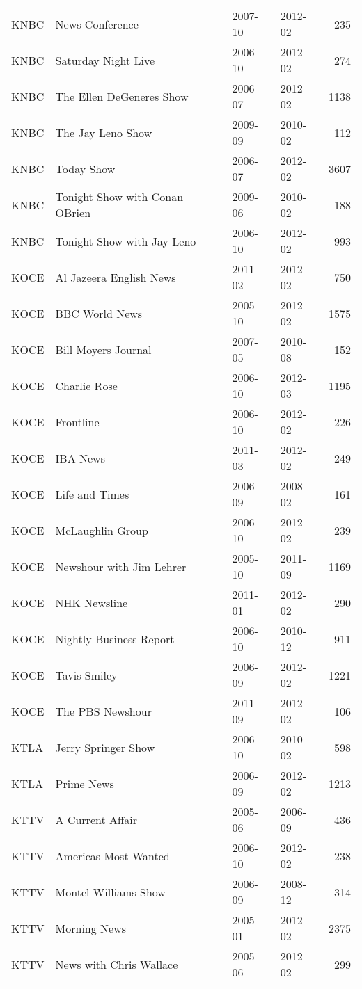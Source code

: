 \begin{table}[ht]
\begin{tabular}{llllr}
  KNBC & News Conference & 2007-10 & 2012-02 & 235 \\ 
  KNBC & Saturday Night Live & 2006-10 & 2012-02 & 274 \\ 
  KNBC & The Ellen DeGeneres Show & 2006-07 & 2012-02 & 1138 \\ 
  KNBC & The Jay Leno Show & 2009-09 & 2010-02 & 112 \\ 
  KNBC & Today Show & 2006-07 & 2012-02 & 3607 \\ 
  KNBC & Tonight Show with Conan OBrien & 2009-06 & 2010-02 & 188 \\ 
  KNBC & Tonight Show with Jay Leno & 2006-10 & 2012-02 & 993 \\ 
  KOCE & Al Jazeera English News & 2011-02 & 2012-02 & 750 \\ 
  KOCE & BBC World News & 2005-10 & 2012-02 & 1575 \\ 
  KOCE & Bill Moyers Journal & 2007-05 & 2010-08 & 152 \\ 
  KOCE & Charlie Rose & 2006-10 & 2012-03 & 1195 \\ 
  KOCE & Frontline & 2006-10 & 2012-02 & 226 \\ 
  KOCE & IBA News & 2011-03 & 2012-02 & 249 \\ 
  KOCE & Life and Times & 2006-09 & 2008-02 & 161 \\ 
  KOCE & McLaughlin Group & 2006-10 & 2012-02 & 239 \\ 
  KOCE & Newshour with Jim Lehrer & 2005-10 & 2011-09 & 1169 \\ 
  KOCE & NHK Newsline & 2011-01 & 2012-02 & 290 \\ 
  KOCE & Nightly Business Report & 2006-10 & 2010-12 & 911 \\ 
  KOCE & Tavis Smiley & 2006-09 & 2012-02 & 1221 \\ 
  KOCE & The PBS Newshour & 2011-09 & 2012-02 & 106 \\ 
  KTLA & Jerry Springer Show & 2006-10 & 2010-02 & 598 \\ 
  KTLA & Prime News  & 2006-09 & 2012-02 & 1213 \\ 
  KTTV & A Current Affair & 2005-06 & 2006-09 & 436 \\ 
  KTTV & Americas Most Wanted & 2006-10 & 2012-02 & 238 \\ 
  KTTV & Montel Williams Show & 2006-09 & 2008-12 & 314 \\ 
  KTTV & Morning News & 2005-01 & 2012-02 & 2375 \\ 
  KTTV & News with Chris Wallace & 2005-06 & 2012-02 & 299 \\ 

\end{tabular}
\end{table}
